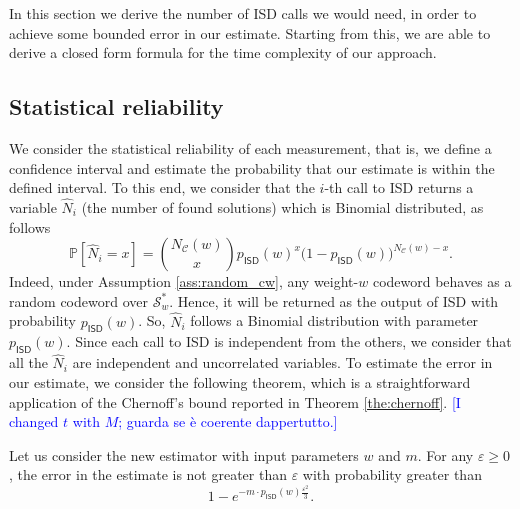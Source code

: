 In this section we derive the number of ISD calls we would need, in order to achieve some bounded error in our estimate.
Starting from this, we are able to derive a closed form formula for the time complexity of our approach.

\subsection{Statistical reliability}

We consider the statistical reliability of each measurement, that is, we define a confidence interval and estimate the probability that our estimate is within the defined interval.
To this end, we consider that the $i$-th call to ISD returns a variable $\widehat N_i$ (the number of found solutions) which is Binomial distributed, as follows
$$\mathbb{P}[\widehat N_i = x] = \binom{N_{\mathscr C}(w)}{x}p_{\mathsf{ISD}}(w)^x\big(1-p_{\mathsf{ISD}}(w)\big)^{N_{\mathscr C}(w)-x}.$$
Indeed, under Assumption \ref{ass:random_cw}, any weight-$w$ codeword behaves as a random codeword over $\mathscr S_w^*$.
Hence, it will be returned as the output of ISD with probability $p_{\mathsf{ISD}}(w)$.
So, $\widehat N_i$ follows a Binomial distribution with parameter $p_{\mathsf{ISD}}(w)$.
Since each call to ISD is independent from the others, we consider that all the $\widehat N_i$ are independent and uncorrelated variables.
To estimate the error in our estimate, we consider the following theorem, which is a straightforward application of the Chernoff's bound reported in Theorem \ref{the:chernoff}.
\textcolor{blue}{[I changed $t$ with $M$; guarda se è coerente dappertutto.]}
\begin{theorem}
Let us consider the new estimator with input parameters $w$ and $m$.
For any $\varepsilon \geq 0$, the error in the estimate is not greater than $\varepsilon$ with probability greater than $$1-e^{-m \cdot p_{\mathsf{ISD}}(w) \frac{\varepsilon^2}{3}}.$$ 
\end{theorem}
